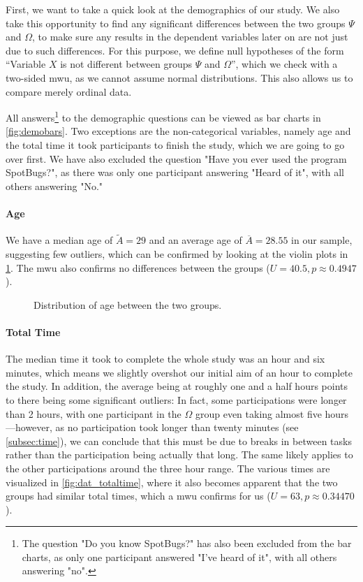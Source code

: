 \documentclass[../thesis]{subfiles}
\begin{document}
First, we want to take a quick look at the demographics of our study.
We also take this opportunity to find any significant differences between the two groups $\Psi$ and $\Omega$, to make sure any results in the dependent variables later on are not just due to such differences.
For this purpose, we define null hypotheses of the form \enquote{Variable $X$ is not different between groups $\Psi$ and $\Omega$}, which we check with a two-sided \gls{mwu}, as we cannot assume normal distributions.
This also allows us to compare merely ordinal data.

All answers\footnote{
	The question "Do you know SpotBugs?" has also been excluded from the bar charts, as only one participant answered "I've heard of it", with all others answering "no".
} to the demographic questions can be viewed as bar charts in \cref{fig:demobars}.
Two exceptions are the non-categorical variables, namely age and the total time it took participants to finish the study, which we are going to go over first.
We have also excluded the question "Have you ever used the program SpotBugs?", as there was only one participant answering "Heard of it", with all others answering "No."


\paragraph{Age}
We have a median age of $\widetilde{A} = 29$ and an average age of $\overline{A} = 28.55$ in our sample, suggesting few outliers, which can be confirmed by looking at the violin plots in \cref{fig:dat_age}.
The \gls{mwu} also confirms no differences between the groups ($U = 40.5, p \approx 0.4947$).

\begin{figure}
	\begin{center}
	\end{center}
	\caption{Distribution of age between the two groups.}\label{fig:dat_age}
\end{figure}

\paragraph{Total Time}
The median time it took to complete the whole study was an hour and six minutes, which means we slightly overshot our initial aim of an hour to complete the study.
In addition, the average being at roughly one and a half hours points to there being some significant outliers:
In fact, some participations were longer than 2 hours, with one participant in the $\Omega$ group even taking almost five hours---however, as no participation took longer than twenty minutes (see \cref{subsec:time}), we can conclude that this must be due to breaks in between tasks rather than the participation being actually that long.
The same likely applies to the other participations around the three hour range.
The various times are visualized in \cref{fig:dat_totaltime}, where it also becomes apparent that the two groups had similar total times, which a \gls{mwu} confirms for us ($U = 63, p \approx 0.34470$).
\end{document}
